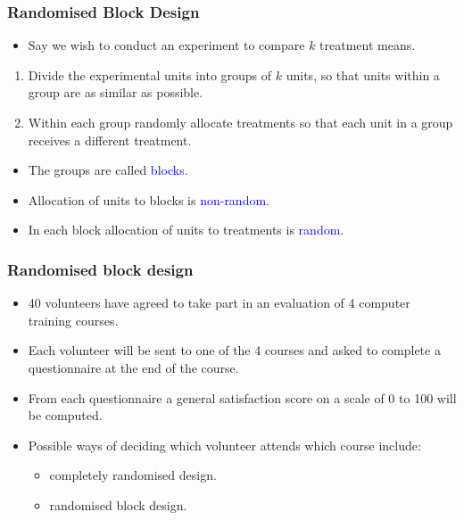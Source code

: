 \documentclass[12pt,xcolor=dvipsnames,handout,mathserif,aspectratio=169]{beamer}
\newcommand{\tc}{\textcolor}
\begin{document}
\begin{frame}\frametitle{Randomised Block Design}
\begin{itemize}
\item Say we wish to conduct an experiment to compare $k$ treatment means.
\end{itemize}
\vspace*{0.3cm}
\begin{enumerate}
\item Divide the experimental units into groups of $k$ units, so that units within a group are as similar as possible.
\item Within each group randomly allocate treatments so that each unit in a group receives a
different treatment.
\end{enumerate}
\vspace*{0.3cm}
\begin{itemize}
\item The groups are called \tc{blue}{blocks}.
\vspace*{0.2cm}
\item Allocation of units to blocks is \tc{blue}{non-random}.
\vspace*{0.2cm}
\item In each block allocation of units to treatments is \tc{blue}{random}.
\end{itemize}
\end{frame}


\begin{frame}
\frametitle{Randomised block design}
\begin{itemize}
\item 40 volunteers have agreed to take part in an evaluation of 4 computer training courses.
\vspace*{0.3cm}
\item Each volunteer will be sent to one of the 4 courses and asked to complete a questionnaire at
the end of the course.
\vspace*{0.3cm}
\item From each questionnaire a general satisfaction score on a scale of 0 to 100 will be computed.
\vspace*{0.3cm}
\item Possible ways of deciding which volunteer attends which course include:
\vspace{0.2cm}
\begin{itemize}
\item completely randomised design.
\vspace{0.2cm}
\item randomised block design.
\end{itemize}
\end{itemize}
\end{frame}
\end{document}
